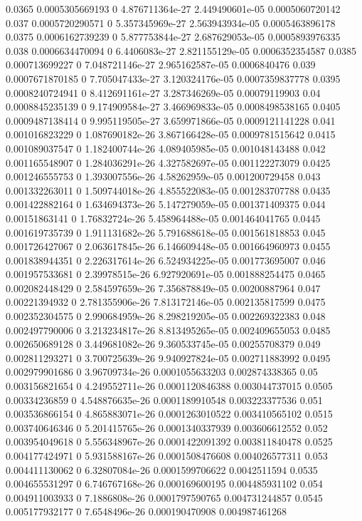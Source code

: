 {0.0365 0.0005305669193 0 4.876711364e-27 2.449490601e-05 0.0005060720142
0.037 0.0005720290571 0 5.357345969e-27 2.563943934e-05 0.0005463896178
0.0375 0.0006162739239 0 5.877753844e-27 2.687629053e-05 0.0005893976335
0.038 0.0006634470094 0 6.4406083e-27 2.821155129e-05 0.0006352354587
0.0385 0.000713699227 0 7.048721146e-27 2.965162587e-05 0.0006840476
0.039 0.0007671870185 0 7.705047433e-27 3.120324176e-05 0.0007359837778
0.0395 0.0008240724941 0 8.412691161e-27 3.287346269e-05 0.00079119903
0.04 0.0008845235139 0 9.174909584e-27 3.466969833e-05 0.0008498538165
0.0405 0.0009487138414 0 9.995119505e-27 3.659971866e-05 0.0009121141228
0.041 0.001016823229 0 1.087690182e-26 3.867166428e-05 0.0009781515642
0.0415 0.001089037547 0 1.182400744e-26 4.089405985e-05 0.001048143488
0.042 0.001165548907 0 1.284036291e-26 4.327582697e-05 0.001122273079
0.0425 0.001246555753 0 1.393007556e-26 4.58262959e-05 0.001200729458
0.043 0.001332263011 0 1.509744018e-26 4.855522083e-05 0.001283707788
0.0435 0.001422882164 0 1.634694373e-26 5.147279059e-05 0.001371409375
0.044 0.00151863141 0 1.76832724e-26 5.458964488e-05 0.001464041765
0.0445 0.001619735739 0 1.911131682e-26 5.791688618e-05 0.001561818853
0.045 0.001726427067 0 2.063617845e-26 6.146609448e-05 0.001664960973
0.0455 0.001838944351 0 2.226317614e-26 6.524934225e-05 0.001773695007
0.046 0.001957533681 0 2.39978515e-26 6.927920691e-05 0.001888254475
0.0465 0.002082448429 0 2.584597659e-26 7.356878849e-05 0.00200887964
0.047 0.00221394932 0 2.781355906e-26 7.813172146e-05 0.002135817599
0.0475 0.002352304575 0 2.990684959e-26 8.298219205e-05 0.002269322383
0.048 0.002497790006 0 3.213234817e-26 8.813495265e-05 0.002409655053
0.0485 0.002650689128 0 3.449681082e-26 9.360533745e-05 0.00255708379
0.049 0.002811293271 0 3.700725639e-26 9.940927824e-05 0.002711883992
0.0495 0.002979901686 0 3.96709734e-26 0.0001055633203 0.002874338365
0.05 0.003156821654 0 4.249552711e-26 0.0001120846388 0.003044737015
0.0505 0.00334236859 0 4.548876635e-26 0.0001189910548 0.003223377536
0.051 0.003536866154 0 4.865883071e-26 0.0001263010522 0.003410565102
0.0515 0.003740646346 0 5.201415765e-26 0.0001340337939 0.003606612552
0.052 0.003954049618 0 5.556348967e-26 0.0001422091392 0.003811840478
0.0525 0.004177424971 0 5.931588167e-26 0.0001508476608 0.004026577311
0.053 0.004411130062 0 6.32807084e-26 0.0001599706622 0.0042511594
0.0535 0.004655531297 0 6.746767168e-26 0.000169600195 0.004485931102
0.054 0.004911003933 0 7.1886808e-26 0.0001797590765 0.004731244857
0.0545 0.005177932177 0 7.6548496e-26 0.000190470908 0.004987461268
}
